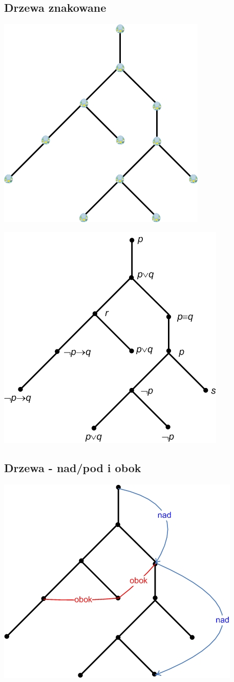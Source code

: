 \documentclass[12pt]{article}
\begin{document}
\subsection{Drzewa znakowane}
\begin{center}
\includegraphics[width=6 cm]{../pliki_wlasne/drzewo5.jpg}
\end{center}
%

\begin{center}
\includegraphics[width=7 cm]{../pliki_wlasne/drzewo6.jpg}
\end{center}
%

\subsection{Drzewa - nad/pod i obok}
\begin{center}
\includegraphics[width=7 cm]{../pliki_wlasne/drzewo7.jpg}
\end{center}
%
\end{document}
